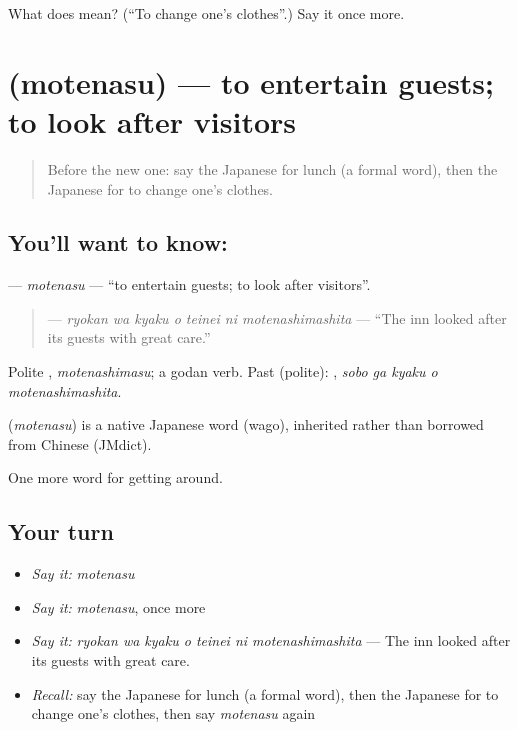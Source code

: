 \begin{tcolorbox}[breakable,colback=teal!4,colframe=teal!35!black,title={Before you move on}]
What does  mean? (\textquotedblleft{}To change one's clothes\textquotedblright{}.) Say it once more.
\end{tcolorbox}
\section[\texorpdfstring{\ja{もてなす} (motenasu)}{もてなす (motenasu)}]{ (motenasu) — to entertain guests; to look after visitors}

\label{lesson:JA-C401-motenasu}



\begin{quote}
Before the new one: say the Japanese for lunch (a formal word), then the Japanese for to change one's clothes.
\end{quote}

\subsection*{You'll want to know: }
\textbf{} — \emph{motenasu} — \textquotedblleft{}to entertain guests; to look after visitors\textquotedblright{}.

\begin{quote}
\textbf{   } — \emph{ryokan wa kyaku o teinei ni motenashimashita} — \textquotedblleft{}The inn looked after its guests with great care.\textquotedblright{}
\end{quote}

Polite \textbf{}, \emph{motenashimasu}; a godan verb. Past (polite): \textbf{  }, \emph{sobo ga kyaku o motenashimashita}.

\begin{cousinweb}
\textbf{} (\emph{motenasu}) is a native Japanese word (wago), inherited rather than borrowed from Chinese (JMdict).
\end{cousinweb}

\begin{grammarlens}[title={What you've built}]
One more word for getting around.
\end{grammarlens}

\subsection*{Your turn}
\begin{itemize}
\raggedright
  \item \emph{Say it:} \emph{motenasu}
  \item \emph{Say it:} \emph{motenasu}, once more
  \item \emph{Say it:} \emph{ryokan wa kyaku o teinei ni motenashimashita} — The inn looked after its guests with great care.
  \item \emph{Recall:} say the Japanese for lunch (a formal word), then the Japanese for to change one's clothes, then say \emph{motenasu} again
\end{itemize}

